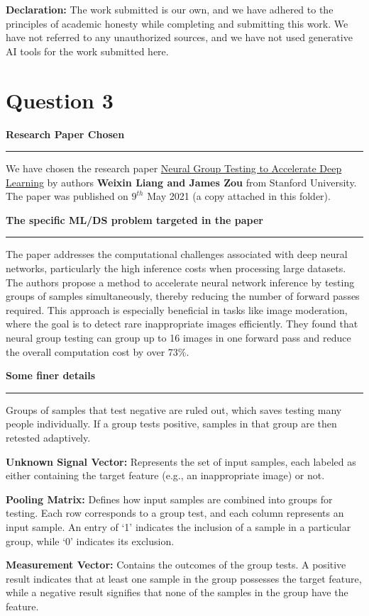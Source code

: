 \documentclass[a4paper,12pt]{article}
\title{\cooltitle{CS754 Assignment-2}}
\author{{\bf Saksham Rathi, Ekansh Ravi Shankar, Kshitij Vaidya}}
\date{}
\newenvironment{solution}[2][]{%
    \begin{mdframed}[linecolor=blue!70!black, linewidth=2pt, roundcorner=10pt, backgroundcolor=yellow!10!white, skipabove=12pt, skipbelow=12pt]%
        \textbf{\large #2}
        \par\noindent\rule{\textwidth}{0.4pt}
}{
    \end{mdframed}
}
\begin{document}
\maketitle
\textbf{Declaration:} The work submitted is our own, and
we have adhered to the principles of academic honesty while completing and submitting this work. We have not referred to any unauthorized sources, and we have not used generative AI tools for the work submitted here.

\section*{Question 3}

\begin{solution}{Research Paper Chosen}
  We have chosen the research paper \href{https://arxiv.org/pdf/2011.10704}{Neural Group Testing to Accelerate Deep Learning} by authors \textbf{Weixin Liang and James Zou} from Stanford University. The paper was published on $9^{th}$ May 2021 (a copy attached in this folder).
\end{solution}

\begin{solution}{The specific ML/DS problem targeted in the paper}
  The paper addresses the computational challenges associated with deep neural networks, particularly the high inference costs when processing large datasets. The authors propose a method to accelerate neural network inference by testing groups of samples simultaneously, thereby reducing the number of forward passes required. This approach is especially beneficial in tasks like image moderation, where the goal is to detect rare inappropriate images efficiently. They found that neural group testing can group up to 16 images in one forward pass and reduce the overall computation cost by over 73\%.
\end{solution}

\begin{solution}{Some finer details}
  Groups of samples that test negative are ruled out, which saves testing many people individually. If a group tests positive, samples in that group are then retested adaptively.
  
  {\bf Unknown Signal Vector:} Represents the set of input samples, each labeled as either containing the target feature (e.g., an inappropriate image) or not.

  {\bf Pooling Matrix:} Defines how input samples are combined into groups for testing. Each row corresponds to a group test, and each column represents an input sample. An entry of `1' indicates the inclusion of a sample in a particular group, while `0' indicates its exclusion.

  {\bf Measurement Vector:} Contains the outcomes of the group tests. A positive result indicates that at least one sample in the group possesses the target feature, while a negative result signifies that none of the samples in the group have the feature.
\end{solution}
\end{document}
